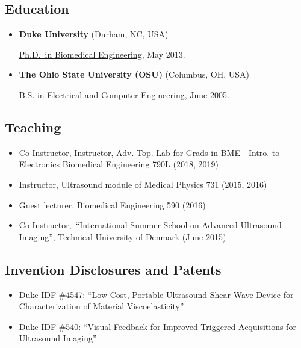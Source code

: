 \documentclass[
]{article}
\providecommand{\tightlist}{%
  \setlength{\itemsep}{0pt}\setlength{\parskip}{0pt}}
\begin{document}
\hypertarget{education}{%
\subsection{Education}\label{education}}

\begin{itemize}
\item
  \textbf{Duke University} (Durham, NC, USA)

  \href{http://bme.duke.edu/grad}{Ph.D.~in Biomedical Engineering}, May
  2013.
\item
  \textbf{The Ohio State University (OSU)} (Columbus, OH, USA)

  \href{http://ece.osu.edu/futurestudents/undergrad}{B.S. in Electrical
  and Computer Engineering}, June 2005.
\end{itemize}

\hypertarget{teaching}{%
\subsection{Teaching}\label{teaching}}

\begin{itemize}
\tightlist
\item
  Co-Instructor, Instructor, Adv. Top. Lab for Grads in BME - Intro. to
  Electronics Biomedical Engineering 790L (2018, 2019)
\item
  Instructor, Ultrasound module of Medical Physics 731 (2015, 2016)
\item
  Guest lecturer, Biomedical Engineering 590 (2016)
\item
  Co-Instructor,~``International Summer School on Advanced Ultrasound
  Imaging'', Technical University of Denmark (June 2015)
\end{itemize}

\hypertarget{invention-disclosures-and-patents}{%
\subsection{Invention Disclosures and
Patents}\label{invention-disclosures-and-patents}}

\begin{itemize}
\tightlist
\item
  Duke IDF \#4547: ``Low-Cost, Portable Ultrasound Shear Wave Device for
  Characterization of Material Viscoelasticity''
\item
  Duke IDF \#540: ``Visual Feedback for Improved Triggered Acquisitions
  for Ultrasound Imaging''
\end{itemize}
\end{document}
